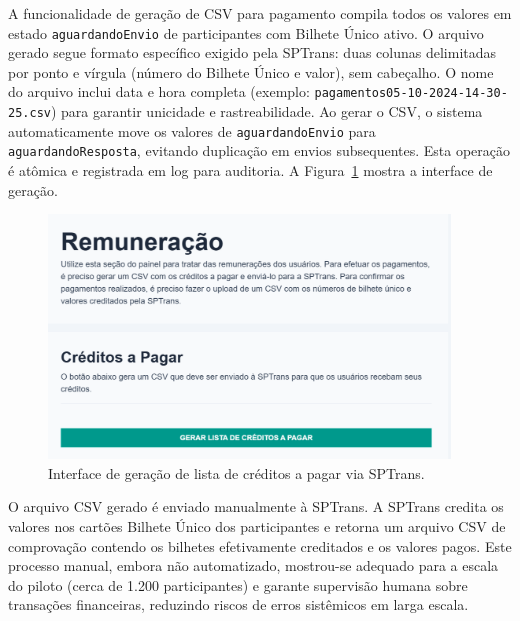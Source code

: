 A funcionalidade de geração de CSV
para pagamento compila todos os valores em estado \texttt{aguardandoEnvio} de
participantes com Bilhete Único ativo. O arquivo gerado segue formato específico
exigido pela SPTrans: duas colunas delimitadas por ponto e vírgula (número do
Bilhete Único e valor), sem cabeçalho. O nome do arquivo inclui data e hora completa (exemplo:
\texttt{pagamentos05-10-2024-14-30-25.csv}) para garantir unicidade e
rastreabilidade. Ao gerar o CSV, o sistema automaticamente move os valores de
\texttt{aguardandoEnvio} para \texttt{aguardandoResposta}, evitando duplicação em
envios subsequentes. Esta operação é atômica e registrada em log para auditoria. A Figura~\ref{fig:remuneracao_gerar_csv_form_creditos} mostra a interface de geração.

\begin{figure}[htb]
    \centering
    \includegraphics[width=0.95\textwidth]{figuras/remuneracao_creditos.png}
    \caption{Interface de geração de lista de créditos a pagar via SPTrans.}
    \label{fig:remuneracao_gerar_csv_form_creditos}
  \end{figure}

O arquivo CSV gerado é enviado
manualmente à SPTrans. A SPTrans credita os valores nos cartões Bilhete
Único dos participantes e retorna um arquivo CSV de comprovação contendo os bilhetes
efetivamente creditados e os valores pagos. Este processo manual, embora não
automatizado, mostrou-se adequado para a escala do piloto (cerca de 1.200
participantes) e garante supervisão humana sobre transações financeiras, reduzindo
riscos de erros sistêmicos em larga escala.



